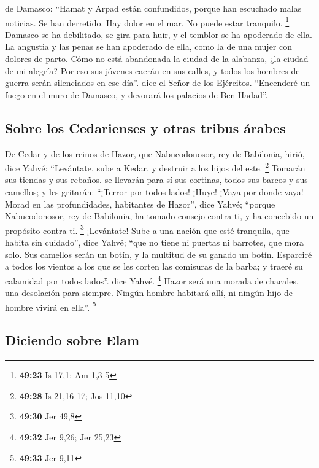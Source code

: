 \begin{paracol}{2}
 de Damasco: ``Hamat y Arpad están confundidos, porque
han escuchado malas noticias. Se han derretido. Hay dolor en el mar. No
puede estar tranquilo. \footnote{\textbf{49:23} Is 17,1; Am 1,3-5}
 Damasco se ha debilitado, se gira para huir, y el
temblor se ha apoderado de ella. La angustia y las penas se han
apoderado de ella, como la de una mujer con dolores de parto.
 Cómo no está abandonada la ciudad de la alabanza, ¿la
ciudad de mi alegría?  Por eso sus jóvenes caerán en sus
calles, y todos los hombres de guerra serán silenciados en ese día''.
dice el Señor de los Ejércitos.  ``Encenderé un fuego en
el muro de Damasco, y devorará los palacios de Ben Hadad''.

\hypertarget{sobre-los-cedarienses-y-otras-tribus-uxe1rabes}{%
\subsection{Sobre los Cedarienses y otras tribus
árabes}\label{sobre-los-cedarienses-y-otras-tribus-uxe1rabes}}

 De Cedar y de los reinos de Hazor, que Nabucodonosor,
rey de Babilonia, hirió, dice Yahvé: ``Levántate, sube a Kedar, y
destruir a los hijos del este. \footnote{\textbf{49:28} Is 21,16-17; Jos
  11,10}  Tomarán sus tiendas y sus rebaños. se llevarán
para sí sus cortinas, todos sus barcos y sus camellos; y les gritarán:
``¡Terror por todos lados!  ¡Huye! ¡Vaya por donde vaya!
Morad en las profundidades, habitantes de Hazor'', dice Yahvé; ``porque
Nabucodonosor, rey de Babilonia, ha tomado consejo contra ti, y ha
concebido un propósito contra ti. \footnote{\textbf{49:30} Jer 49,8}
 ¡Levántate! Sube a una nación que esté tranquila, que
habita sin cuidado'', dice Yahvé; ``que no tiene ni puertas ni barrotes,
que mora solo.  Sus camellos serán un botín, y la
multitud de su ganado un botín. Esparciré a todos los vientos a los que
se les corten las comisuras de la barba; y traeré su calamidad por todos
lados''. dice Yahvé. \footnote{\textbf{49:32} Jer 9,26; Jer 25,23}
 Hazor será una morada de chacales, una desolación para
siempre. Ningún hombre habitará allí, ni ningún hijo de hombre vivirá en
ella''. \footnote{\textbf{49:33} Jer 9,11}

\hypertarget{diciendo-sobre-elam}{%
\subsection{Diciendo sobre Elam}\label{diciendo-sobre-elam}}


\end{paracol}
